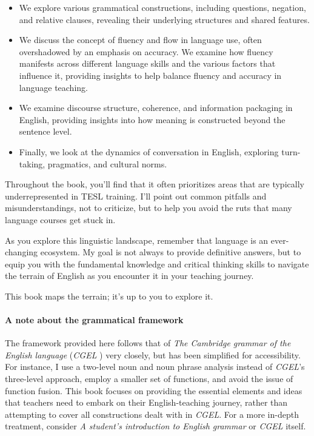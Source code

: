 \begin{itemize}
    \item We explore various grammatical constructions, including questions, negation, and relative clauses, revealing their underlying structures and shared features.

    \item We discuss the concept of fluency and flow in language use, often overshadowed by an emphasis on accuracy. We examine how fluency manifests across different language skills and the various factors that influence it, providing insights to help balance fluency and accuracy in language teaching.

    \item We examine discourse structure, coherence, and information packaging in English, providing insights into how meaning is constructed beyond the sentence level.

    \item Finally, we look at the dynamics of conversation in English, exploring turn-taking, pragmatics, and cultural norms.
\end{itemize}

Throughout the book, you'll find that it often prioritizes areas that are typically underrepresented in TESL training. I'll point out common pitfalls and misunderstandings, not to criticize, but to help you avoid the ruts that many language courses get stuck in.

As you explore this linguistic landscape, remember that language is an ever-changing ecosystem. My goal is not always to provide definitive answers, but to equip you with the fundamental knowledge and critical thinking skills to navigate the terrain of English as you encounter it in your teaching journey.

This book maps the terrain; it's up to you to explore it.

\paragraph*{A note about the grammatical framework}

The framework provided here follows that of \textit{The Cambridge grammar of the English language} (\textit{CGEL} \cite{Huddleston2002}) very closely, but has been simplified for accessibility. For instance, I use a two-level noun and noun phrase analysis instead of \textit{CGEL}'s three-level approach, employ a smaller set of functions, and avoid the issue of function fusion. This book focuses on providing the essential elements and ideas that teachers need to embark on their English-teaching journey, rather than attempting to cover all constructions dealt with in \textit{CGEL}. For a more in-depth treatment, consider \textit{A student's introduction to English grammar} \citep{huddleston2022} or \textit{CGEL} itself.

